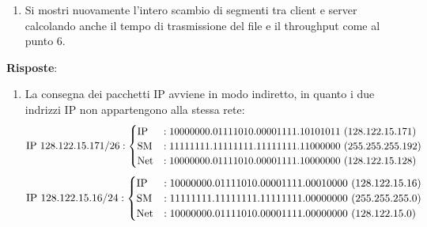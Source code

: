 \documentclass[10pt]{article}
\begin{document}
	\begin{enumerate}[resume]
		\item Si mostri nuovamente l'intero scambio di segmenti tra client e server calcolando anche il tempo di trasmissione del file e il throughput come al punto 6.
	\end{enumerate}
	\textbf{Risposte}:
	\begin{enumerate}
		\item La consegna dei pacchetti IP avviene in modo indiretto, in quanto i due indrizzi IP non appartengono alla stessa rete:
		\[
			\textnormal{IP } 128.122.15.171/26:
			\begin{cases}
				\textnormal{IP} & : 10000000.01111010.00001111.10101011 \,\,(128.122.15.171)\\
				\textnormal{SM} & : 11111111.11111111.11111111.11000000 \,\,(255.255.255.192) \\
				\textnormal{Net} & : 10000000.01111010.00001111.10000000 \,\,(128.122.15.128)
			\end{cases}
		\]
		\[
			\textnormal{IP } 128.122.15.16/24:
			\begin{cases}
				\textnormal{IP} & : 10000000.01111010.00001111.00010000 \,\,(128.122.15.16)\\
				\textnormal{SM} & : 11111111.11111111.11111111.00000000 \,\,(255.255.255.0) \\
				\textnormal{Net} & : 10000000.01111010.00001111.00000000 \,\,( 128.122.15.0)
			\end{cases}
		\]
		

\end{enumerate}
\end{document}
